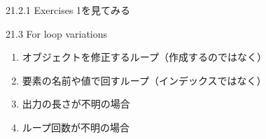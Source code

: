 \documentclass[
  ignorenonframetext,
  aspectratio=169]{beamer}
\providecommand{\tightlist}{%
  \setlength{\itemsep}{0pt}\setlength{\parskip}{0pt}}
\begin{document}
\begin{frame}{21.2.1 Exercises}
\protect\hypertarget{exercises}{}
1を見てみる
\end{frame}

\begin{frame}{21.3 For loop variations}
\protect\hypertarget{for-loop-variations}{}
\begin{enumerate}
\tightlist
\item
  オブジェクトを修正するループ（作成するのではなく）
\item
  要素の名前や値で回すループ（インデックスではなく）
\item
  出力の長さが不明の場合
\item
  ループ回数が不明の場合
\end{enumerate}
\end{frame}
\end{document}
